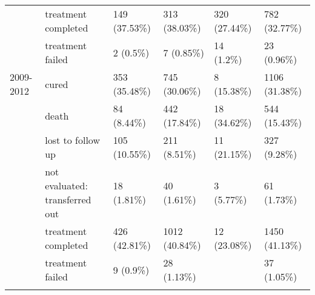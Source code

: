 \documentclass{article}
\begin{document}
\begin{landscape}
\begin{table}[!htbp]
\begin{tabular}{@{\extracolsep{5pt}} llllll}
 & treatment completed & 149 (37.53\%) & 313 (38.03\%) & 320 (27.44\%) & 782 (32.77\%) \\ 
 & treatment failed & 2 (0.5\%) & 7 (0.85\%) & 14 (1.2\%) & 23 (0.96\%) \\ 
2009-2012 & cured & 353 (35.48\%) & 745 (30.06\%) & 8 (15.38\%) & 1106 (31.38\%) \\ 
 & death & 84 (8.44\%) & 442 (17.84\%) & 18 (34.62\%) & 544 (15.43\%) \\ 
 & lost to follow up & 105 (10.55\%) & 211 (8.51\%) & 11 (21.15\%) & 327 (9.28\%) \\ 
 & not evaluated: transferred out & 18 (1.81\%) & 40 (1.61\%) & 3 (5.77\%) & 61 (1.73\%) \\ 
 & treatment completed & 426 (42.81\%) & 1012 (40.84\%) & 12 (23.08\%) & 1450 (41.13\%) \\ 
 & treatment failed & 9 (0.9\%) & 28 (1.13\%) &  & 37 (1.05\%) \\ 
\hline \\[-1.8ex] 
\end{tabular} 
\end{table} 


\end{landscape}
\end{document}

